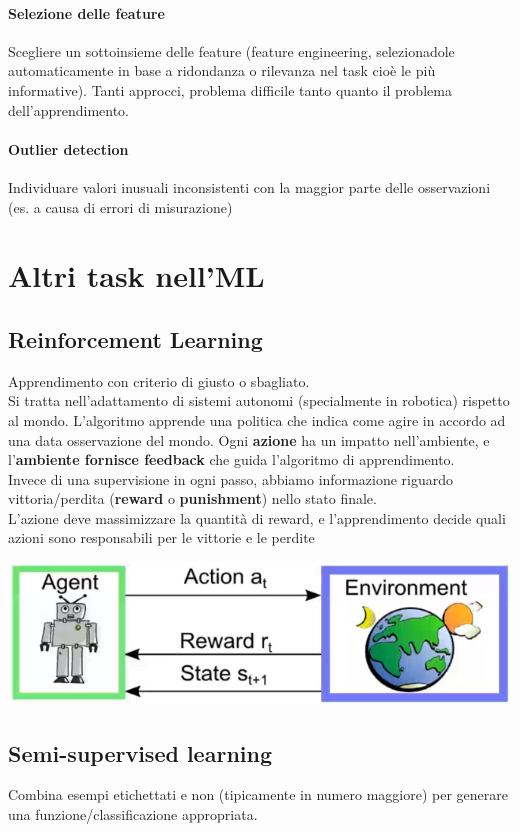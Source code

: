 \documentclass[10pt]{book}
\begin{document}
\paragraph{Selezione delle feature} Scegliere un sottoinsieme delle feature (feature engineering, selezionadole automaticamente in base a ridondanza o rilevanza nel task cioè le più informative). Tanti approcci, problema difficile tanto quanto il problema dell'apprendimento.
\paragraph{Outlier detection} Individuare valori inusuali inconsistenti con la maggior parte delle osservazioni (es. a causa di errori di misurazione)
\section{Altri task nell'ML}
\subsection{Reinforcement Learning} Apprendimento con criterio di giusto o sbagliato.\\
Si tratta nell'adattamento di sistemi autonomi (specialmente in robotica) rispetto al mondo. L'algoritmo apprende una politica che indica come agire in accordo ad una data osservazione del mondo. Ogni \textbf{azione} ha un impatto nell'ambiente, e l'\textbf{ambiente fornisce feedback} che guida l'algoritmo di apprendimento.\\
Invece di una supervisione in ogni passo, abbiamo informazione riguardo vittoria/perdita (\textbf{reward} o \textbf{punishment}) nello stato finale.\\
L'azione deve massimizzare la quantità di reward, e l'apprendimento decide quali azioni sono responsabili per le vittorie e le perdite
\begin{center}
	\includegraphics[scale=0.75]{mlreinfor.png}
\end{center}
\subsection{Semi-supervised learning} Combina esempi etichettati e non (tipicamente in numero maggiore) per generare una funzione/classificazione appropriata.
\end{document}
